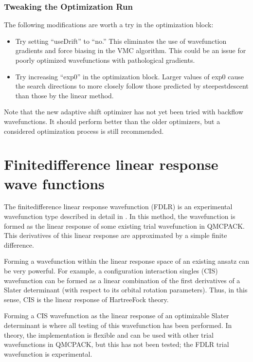 \documentclass[letterpaper,10pt,english]{sphinxmanual}
\begin{document}
\subsubsection{Tweaking the Optimization Run}
\label{\detokenize{intro_wavefunction:tweaking-the-optimization-run}}
The following modifications are worth a try in the optimization block:
\begin{itemize}
\item {} 
Try setting “useDrift” to “no.” This eliminates the use of
wavefunction gradients and force biasing in the VMC algorithm. This
could be an issue for poorly optimized wavefunctions with
pathological gradients.

\item {} 
Try increasing “exp0” in the optimization block. Larger values of
exp0 cause the search directions to more closely follow those
predicted by steepest\sphinxhyphen{}descent than those by the linear method.

\end{itemize}

Note that the new adaptive shift optimizer has not yet been tried with
backflow wavefunctions. It should perform better than the older
optimizers, but a considered optimization process is still recommended.


\section{Finite\sphinxhyphen{}difference linear response wave functions}
\label{\detokenize{intro_wavefunction:finite-difference-linear-response-wave-functions}}\label{\detokenize{intro_wavefunction:fdlr}}
The finite\sphinxhyphen{}difference linear response wavefunction (FDLR) is an
experimental wavefunction type described in detail in
. In this method, the wavefunction is formed as the linear response of some existing trial wavefunction in QMCPACK. This derivatives of this linear response are
approximated by a simple finite difference.

Forming a wavefunction within the linear response space of an existing ansatz can be very powerful. For example, a configuration interaction singles (CIS) wavefunction can be formed as a linear combination of the first derivatives of a Slater determinant (with respect to its orbital rotation parameters). Thus, in this sense, CIS is the linear response of Hartree\textendash{}Fock theory.

Forming a CIS wavefunction as the linear response of an optimizable Slater determinant is where all testing of this wavefunction has been performed. In theory, the implementation is flexible and can be used with other trial wavefunctions in QMCPACK, but this has not been tested; the FDLR trial wavefunction is experimental.
\end{document}
